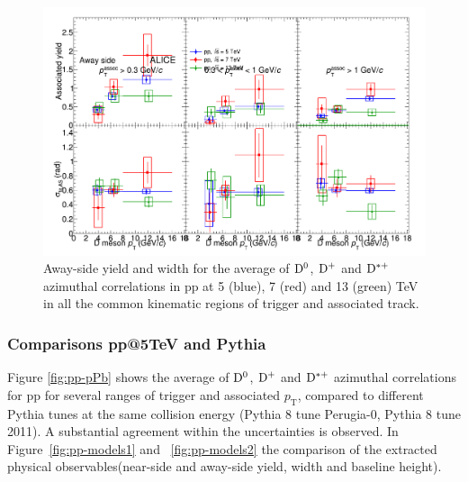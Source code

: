 \begin{figure}
\centering
\includegraphics[width=.96\textwidth]{figures/ComparisonToOtherpp/CompareFitResults_DiffppEnergies_AwaySide.png}
\caption{Away-side yield and width for the average of ${\rm D^0}$, ${\rm D^+}$ and ${\rm D^{*+}}$ azimuthal correlations in pp at 5 (blue), 7 (red) and 13 (green) TeV in all the common kinematic regions of trigger and associated track.}
\label{fig:AllppFit2}
\end{figure}




\subsubsection{Comparisons pp@5TeV and Pythia}
Figure \ref{fig:pp-pPb} shows the average of ${\rm D^0}$, ${\rm D^+}$ and ${\rm D^{*+}}$ azimuthal correlations for pp for several ranges of trigger and associated $p_\mathrm{T}$, compared to different Pythia tunes at the same collision energy (Pythia 8 tune Perugia-0, Pythia 8 tune 2011). A substantial agreement within the uncertainties is observed. In Figure~\ref{fig:pp-models1} and ~\ref{fig:pp-models2} the comparison of the extracted physical observables(near-side and away-side yield, width and baseline height). %

